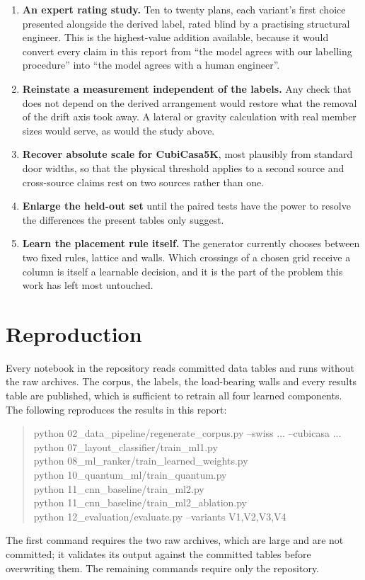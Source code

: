 \begin{enumerate}
\item \textbf{An expert rating study.} Ten to twenty plans, each variant's
first choice presented alongside the derived label, rated blind by a
practising structural engineer. This is the highest-value addition
available, because it would convert every claim in this report from
``the model agrees with our labelling procedure'' into ``the model agrees
with a human engineer''.

\item \textbf{Reinstate a measurement independent of the labels.} Any
check that does not depend on the derived arrangement would restore what
the removal of the drift axis took away. A lateral or gravity calculation
with real member sizes would serve, as would the study above.

\item \textbf{Recover absolute scale for CubiCasa5K}, most plausibly from
standard door widths, so that the physical threshold applies to a second
source and cross-source claims rest on two sources rather than one.

\item \textbf{Enlarge the held-out set} until the paired tests have the
power to resolve the differences the present tables only suggest.

\item \textbf{Learn the placement rule itself.} The generator currently
chooses between two fixed rules, lattice and walls. Which crossings of a
chosen grid receive a column is itself a learnable decision, and it is
the part of the problem this work has left most untouched.
\end{enumerate}

\section{Reproduction}

Every notebook in the repository reads committed data tables and runs
without the raw archives. The corpus, the labels, the load-bearing walls
and every results table are published, which is sufficient to retrain all
four learned components. The following reproduces the results in this
report:

\begin{quote}\small\ttfamily
python 02\_data\_pipeline/regenerate\_corpus.py --swiss ... --cubicasa ...\\
python 07\_layout\_classifier/train\_ml1.py\\
python 08\_ml\_ranker/train\_learned\_weights.py\\
python 10\_quantum\_ml/train\_quantum.py\\
python 11\_cnn\_baseline/train\_ml2.py\\
python 11\_cnn\_baseline/train\_ml2\_ablation.py\\
python 12\_evaluation/evaluate.py --variants V1,V2,V3,V4
\end{quote}

The first command requires the two raw archives, which are large and are
not committed; it validates its output against the committed tables before
overwriting them. The remaining commands require only the repository.
